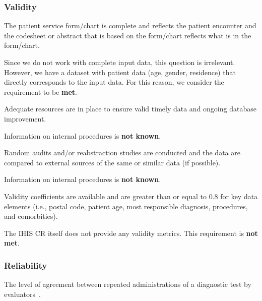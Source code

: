 \subsubsection{Validity}

\begin{QandA}
    \item The patient service form/chart is complete and reflects the patient encounter and the codesheet or abstract that is based on the form/chart reflects what is in the form/chart.
    \begin{answered}
        Since we do not work with complete input data, this question is irrelevant.
        However, we have a dataset with patient data (age, gender, residence) that directly corresponds to the input data.
        For this reason, we consider the requirement to be \textbf{met}.
    \end{answered}

    \item Adequate resources are in place to ensure valid timely data and ongoing database improvement.
    \begin{answered}
        Information on internal procedures is \textbf{not known}.
    \end{answered}

    \item Random audits and/or reabstraction studies are conducted and the data are compared to external sources of the same or similar data (if possible).
    \begin{answered}
        Information on internal procedures is \textbf{not known}.
    \end{answered}

    \item Validity coefficients are available and are greater than or equal to 0.8 for key data elements (i.e., postal code, patient age, most responsible diagnosis, procedures, and comorbities).
    \begin{answered}
        The IHIS CR itself does not provide any validity metrics.
        This requirement is \textbf{not met}.
    \end{answered}

\end{QandA}

\subsubsection{Reliability}

The level of agreement between repeated administrations of a diagnostic test by evaluators~\cite{kilem2008}.

